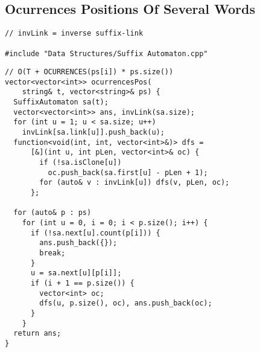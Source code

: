 \documentclass[twoside]{article}
\begin{document}
\begin{multicols*}{2}
\subsectionfont{\large\bfseries\sffamily\underline}
\subsection*{Ocurrences Positions Of Several Words}
\begin{verbatim}
// invLink = inverse suffix-link

#include "Data Structures/Suffix Automaton.cpp"
\end{verbatim}
\vspace{-12pt}
\begin{verbatim}
// O(T + OCURRENCES(ps[i]) * ps.size())
vector<vector<int>> ocurrencesPos(
    string& t, vector<string>& ps) {
  SuffixAutomaton sa(t);
  vector<vector<int>> ans, invLink(sa.size);
  for (int u = 1; u < sa.size; u++)
    invLink[sa.link[u]].push_back(u);
  function<void(int, int, vector<int>&)> dfs =
      [&](int u, int pLen, vector<int>& oc) {
        if (!sa.isClone[u])
          oc.push_back(sa.first[u] - pLen + 1);
        for (auto& v : invLink[u]) dfs(v, pLen, oc);
      };

  for (auto& p : ps)
    for (int u = 0, i = 0; i < p.size(); i++) {
      if (!sa.next[u].count(p[i])) {
        ans.push_back({});
        break;
      }
      u = sa.next[u][p[i]];
      if (i + 1 == p.size()) {
        vector<int> oc;
        dfs(u, p.size(), oc), ans.push_back(oc);
      }
    }
  return ans;
}
\end{verbatim}

\subsectionfont{\large\bfseries\sffamily\underline}

\end{multicols*}
\end{document}
